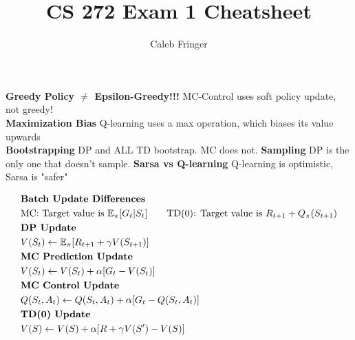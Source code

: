\documentclass{article}
\author{Caleb Fringer}
\title{CS 272 Exam 1 Cheatsheet}
\begin{document}
\maketitle

\textbf{Greedy Policy $\ne$ Epsilon-Greedy!!!} MC-Control uses soft policy update, not greedy! \\
\textbf{Maximization Bias} Q-learning uses a max operation, which biases its value upwards \\
\textbf{Bootstrapping} DP and ALL TD bootstrap. MC does not.
\textbf{Sampling} DP is the only one that doesn't sample.
\textbf{Sarsa vs Q-learning} Q-learning is optimistic, Sarsa is "safer"

\begin{align*}
	 & \text{\textbf{Batch Update Differences}}                                                                                                                \\
	 & \text{MC: Target value is } \mathbb{E}_\pi[G_t|S_t] \qquad \text{TD(0): Target value is } R_{t+1} + Q_\pi(S_{t+1})                                      \\
	 & \text{\textbf{DP Update}}                                                                                                                               \\
	 & V(S_t) \leftarrow \mathbb{E_{\pi}}[R_{t+1} + \gamma V(S_{t+1})]                                                                                         \\
	 & \text{\textbf{MC Prediction Update}}                                                                                                                    \\
	 & V(S_t) \leftarrow V(S_t) + \alpha[G_t  - V(S_t)]                                                                                                        \\
	 & \text{\textbf{MC Control Update}}                                                                                                                       \\
	 & Q(S_t,A_t) \leftarrow Q(S_t,A_t) + \alpha[G_t  - Q(S_t,A_t)]                                                                                            \\
	 & \text{\textbf{TD(0) Update}}                                                                                                                            \\
	 & V(S) \leftarrow V(S) + \alpha[R + \gamma V(S') - V(S)]                                                                                                  \\

\end{align*}
\end{document}
